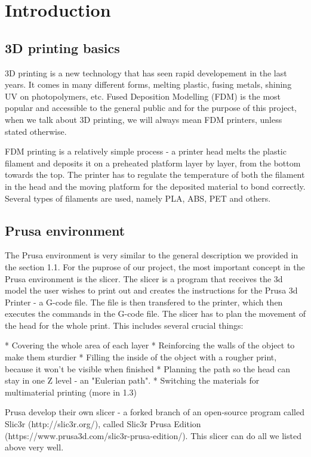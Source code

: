 \chapter{Introduction}

\section{3D printing basics}

3D printing is a new technology that has seen rapid developement in the last years. It comes in many different forms, melting plastic, fusing metals, shining UV on photopolymers, etc. Fused Deposition Modelling (FDM) is the most popular and accessible to the general public and for the purpose of this project, when we talk about 3D printing, we will always mean FDM printers, unless stated otherwise.

FDM printing is a relatively simple process - a printer head melts the plastic filament and deposits it on a preheated platform layer by layer, from the bottom towards the top. The printer has to regulate the temperature of both the filament in the head and the moving platform for the deposited material to bond correctly. Several types of filaments are used, namely PLA, ABS, PET and others.

\section{Prusa environment}

The Prusa environment is very similar to the general description we provided in the section 1.1. For the puprose of our project, the most important concept in the Prusa environment is the slicer. The slicer is a program that receives the 3d model the user wishes to print out and creates the instructions for the Prusa 3d Printer - a G-code file. The file is then transfered to the printer, which then executes the commands in the G-code file. The slicer has to plan the movement of the head for the whole print. This includes several crucial things:

* Covering the whole area of each layer
* Reinforcing the walls of the object to make them sturdier
* Filling the inside of the object with a rougher print, because it won't be visible when finished
* Planning the path so the head can stay in one Z level - an "Eulerian path".
* Switching the materials for multimaterial printing (more in 1.3)

Prusa develop their own slicer - a forked branch of an open-source program called Slic3r (http://slic3r.org/), called Slic3r Prusa Edition (https://www.prusa3d.com/slic3r-prusa-edition/). This slicer can do all we listed above very well.

